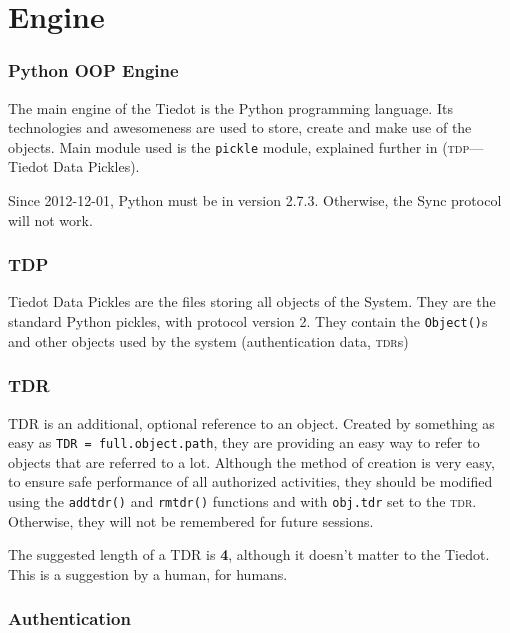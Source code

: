\documentclass[a4paper,english]{paper}
\providecommand{\\}{\\}
\begin{document}
\pagebreak




\part{Engine}
\label{chap:Engine}
\section{Python OOP Engine}
\label{sec:Python OOP Engine}

The main engine of the Tiedot is the Python programming language.  Its
technologies and awesomeness are used to store, create and make use of the
objects.  Main module used is the \texttt{pickle} module, explained further in
 (\textsc{tdp}---Tiedot Data Pickles).

Since 2012-12-01, Python must be in version 2.7.3.  Otherwise, the Sync
protocol will not work.

\section{TDP}
\label{sec:TDP}

Tiedot Data Pickles are the files storing all objects of the System.  They are the
standard Python pickles, with protocol version 2.  They contain the
\texttt{Object()}s and other objects used by the system (authentication data,
\textsc{tdr}s)

\section{TDR}
\label{sec:TDR}

TDR is an additional, optional reference to an object.  Created by something
as easy as \texttt{TDR = full.object.path}, they are providing an easy way to
refer to objects that are referred to a lot.  Although the method of creation
is very easy, to ensure safe performance of all authorized activities, they
should be modified using the \texttt{addtdr()} and \texttt{rmtdr()}
functions and with \texttt{obj.tdr} set to the \textsc{tdr}.  Otherwise, they will
not be remembered for future sessions.

The suggested length of a TDR is \textbf{4}, although it doesn't matter to the
Tiedot.  This is a suggestion by a human, for humans.

\section{Authentication}
\label{sec:Authentication}
\end{document}
